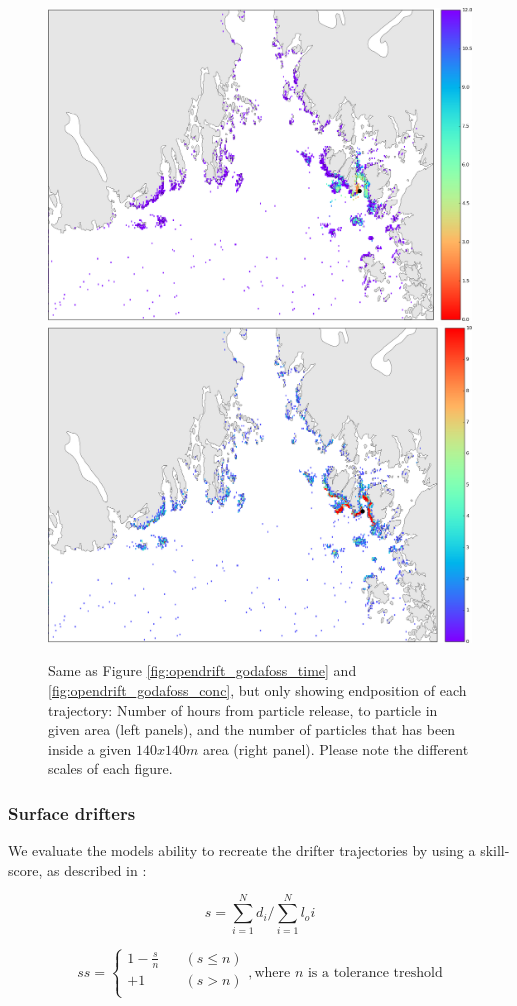 \begin{figure}[ht]
\centerline{
\includegraphics*[width=.5\textwidth]{Figurer/opendrift/opendrift_godafoss_shortest_time_zoom_endpos_crop}
\includegraphics*[width=.5\textwidth]{Figurer/opendrift/opendrift_godafoss_consentration_zoom_endpos_crop}
}
\caption{\small
Same as Figure \ref{fig:opendrift_godafoss_time} and \ref{fig:opendrift_godafoss_conc}, but only showing endposition of each trajectory: Number of hours from particle release, to particle in given area (left panels), and the number of particles that has been inside a given $140x140m$ area (right panel). Please note the different scales of each figure.}
\label{fig:opendrift_godafoss_endpos}
\end{figure}

\clearpage 
\subsubsection{Surface drifters}
We evaluate the models ability to recreate the drifter trajectories by using a skill-score, as described in \cite{liu:weisberg:2011}: 

$$s=\displaystyle\sum_{i=1}^{N} d_i / \displaystyle\sum_{i=1}^{N} l_oi$$

\[ ss = 
  \begin{cases}
    1 - \frac{s}{n}   & \quad (s \leq n)\\
    +1                & \quad (s > n)   \\ 
  \end{cases}
  , \text{where $n$ is a tolerance treshold}
\]

